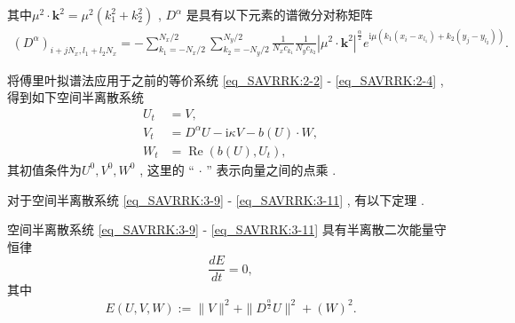 其中$\mu^{2} \cdot \mathbf{k}^{2}=\mu^{2}\left(k_{1}^{2}+k_{2}^{2}\right)$ , $D^{\alpha}$ 是具有以下元素的谱微分对称矩阵
\begin{align}\label{eq_SAVRRK:54}
\left(D^{\alpha}\right)_{i+j N_{x} , l_{1}+l_{2} N_{x}}=-\sum\limits_{k_{1}=-N_{x} / 2}^{N_{x} / 2} \sum\limits_{k_{2}=-N_{y} / 2}^{N_{y} / 2}\frac{1}{N_{x} c_{k_{1}}} \frac{1}{N_{y} c_{k_{2}}}\left|\mu^{2} \cdot \mathbf{k}^{2}\right|^{\frac{\alpha}{2}} e^{\mathrm{i}\mu\left(k_{1}\left(x_{i}-x_{l_{1}}\right)+k_{2}\left(y_{j}-y_{l_{2}}\right)\right)} . 
\end{align}

将傅里叶拟谱法应用于之前的等价系统 \eqref{eq_SAVRRK:2-2} - \eqref{eq_SAVRRK:2-4} , 得到如下空间半离散系统
\begin{align}
 U_t&=V , \label{eq_SAVRRK:3-9}\\
 V_t&=D^{\alpha} U-\mathrm{i}\kappa V- b(U) \cdot W , \label{eq_SAVRRK:3-10}\\
 W_t&=\operatorname{Re}\left(b(U) , U_t\right) , \label{eq_SAVRRK:3-11}
\end{align}
其初值条件为$U^0 , V^0 , W^0$ , 这里的 “ $\cdot$ ” 表示向量之间的点乘 . 

对于空间半离散系统 \eqref{eq_SAVRRK:3-9} - \eqref{eq_SAVRRK:3-11} , 有以下定理 . 

\begin{theorem}	\label{thm3}
空间半离散系统 \eqref{eq_SAVRRK:3-9} - \eqref{eq_SAVRRK:3-11} 具有半离散二次能量守恒律
\begin{equation}
\frac{dE}{dt}=0 , \label{eq_SAVRRK:313a}
\end{equation}
其中
\begin{equation}
E(U , V , W):=\|V\|^2 + \|D^\frac{\alpha}{2} U\|^2+\left(W\right)^2 . \label{eq_SAVRRK:313}
\end{equation}
\end{theorem}

